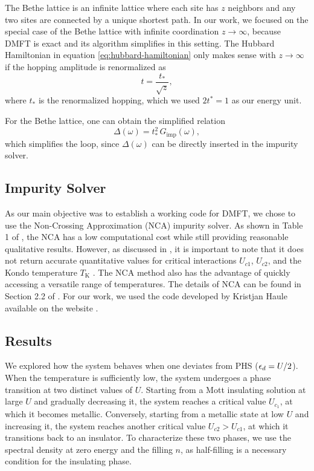 \documentclass[12pt]{report}
\newcommand{\ALERT}[1]{\textcolor{red}{#1}}
\begin{document}
The Bethe lattice is an infinite lattice where each site has $z$ neighbors and any two sites are connected by a unique shortest path. In our work, we focused on the special case of the Bethe lattice with infinite coordination $z\to\infty$, because DMFT is exact and its algorithm simplifies in this setting. The Hubbard Hamiltonian in equation \ref{eq:hubbard-hamiltonian} only makes sense with $z\to\infty$ if the hopping amplitude is renormalized as \cite{thesis_bruno}
\begin{equation} \label{eq:hopping-renormalization}
t = \frac{t_*}{\sqrt{z}},
\end{equation}
where $t_*$ is the renormalized hopping, which we used $2t^* = 1$ as our energy unit.

For the Bethe lattice, one can obtain the simplified relation \cite{thesis_bruno}
\begin{equation} \label{eq:simple-hybridization-bethe}
\Delta(\omega) = t_*^2 \, G_{\text{imp}}(\omega),
\end{equation}
which simplifies the loop, since $\Delta(\omega)$ can be directly inserted in the impurity solver.

\subsection{Impurity Solver} \label{sec:impurity-solver}

As our main objective was to establish a working code for DMFT, we chose to use the Non-Crossing Approximation (NCA) impurity solver. As shown in Table 1 of \cite{impurity-solvers}, the NCA has a low computational cost while still providing reasonable qualitative results. However, as discussed in \cite{vildosola2015}, it is important to note that it does not return accurate quantitative values for critical interactions $U_{c1}$, $U_{c2}$, and the Kondo temperature $T_{\text{K}}$ \cite{haule_real_materials, vildosola2015}. The NCA method also has the advantage of quickly accessing a versatile range of temperatures. The details of NCA can be found in Section 2.2 of \cite{thesis_bruno}. For our work, we used the code developed by Kristjan Haule available on the website \cite{hauleweb}.

\subsection{Results} \label{sec:results}

We explored how the system behaves when one deviates from PHS ($\epsilon_d = U/2$). When the temperature is sufficiently low, the system undergoes a phase transition at two distinct values of $U$. Starting from a Mott insulating solution at large $U$ and gradually decreasing it, the system reaches a critical value $U_{c_1}$, at which it becomes metallic. Conversely, starting from a metallic state at low $U$ and increasing it, the system reaches another critical value $U_{c2} > U_{c1}$, at which it transitions back to an insulator. To characterize these two phases, we use the spectral density at zero energy \cite{georges1996} and the filling $n$, as half-filling is a necessary condition for the insulating phase.
\end{document}
